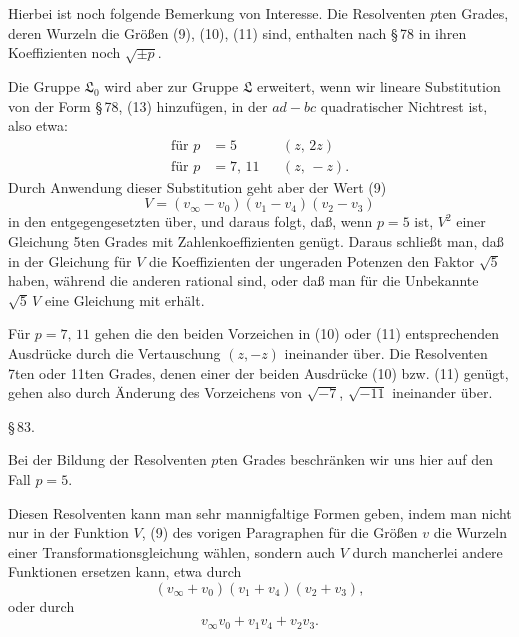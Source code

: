 Hierbei ist noch folgende Bemerkung von Interesse. Die Resolventen $p$ten Grades, deren Wurzeln die Größen (9), (10), (11) sind, enthalten nach §\,78 in ihren Koeffizienten noch $\sqrt{\pm p}$.

Die Gruppe $\mathfrak{L}_0$ wird aber zur Gruppe $\mathfrak{L}$ erweitert, wenn wir  lineare Substitution von der Form §\,78, (13) hinzufügen, in der $ad - bc$ quadratischer Nichtrest ist, also etwa: %
\[
\begin{aligned}
\text{für } p&=5 & &(z,\,2z)\\
\text{für } p&=7,\,11 & &(z,\,-z).
\end{aligned}
\]
Durch Anwendung dieser Substitution geht aber der Wert (9)
\[
V = (v_\infty - v_0)(v_1 - v_4)(v_2 - v_3)
\]
in den entgegengesetzten über, und daraus folgt, daß, wenn $p=5$ ist, $V^2$ einer Gleichung 5ten Grades mit  Zahlenkoeffizienten genügt. Daraus schließt man, daß in der Gleichung für $V$ die Koeffizienten der ungeraden Potenzen den Faktor $\sqrt5$ haben, während die anderen rational sind, oder daß man für die Unbekannte $\sqrt5\,V$ eine Gleichung mit  erhält.

Für $p=7,\,11$ gehen die den beiden Vorzeichen in (10) oder (11) entsprechenden Ausdrücke durch die Vertauschung $(z,-z)$ ineinander über. Die Resolventen 7ten oder 11ten Grades, denen einer der beiden Ausdrücke (10) bzw. (11) genügt, gehen also durch Änderung des Vorzeichens von $\sqrt{-7}$, $\sqrt{-11}$ ineinander über.

§\,83. 

Bei der Bildung der Resolventen $p$ten Grades beschränken wir uns hier auf den Fall $p=5$.

Diesen Resolventen kann man sehr mannigfaltige Formen geben, indem man nicht nur in der Funktion $V$, (9) des vorigen Paragraphen für die Größen $v$ die Wurzeln einer  Transformationsgleichung wählen, sondern auch $V$ durch mancherlei andere Funktionen ersetzen kann, etwa durch
\[
(v_\infty + v_0)(v_1+v_4)(v_2+v_3),
\]
oder durch
\[
v_\infty v_0 + v_1 v_4 + v_2 v_3.
\]
